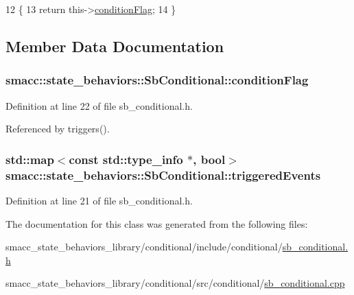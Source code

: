 \begin{DoxyCode}
12 \{
13     \textcolor{keywordflow}{return} this->\hyperlink{classsmacc_1_1state__behaviors_1_1SbConditional_aa998f63dc35b51916a896c62d9e03df1}{conditionFlag};
14 \}
\end{DoxyCode}


\subsection{Member Data Documentation}
\subsubsection[{\texorpdfstring{condition\+Flag}{conditionFlag}}]{ smacc\+::state\+\_\+behaviors\+::\+Sb\+Conditional\+::condition\+Flag\hspace{0.3cm}{\ttfamily [private]}}\hypertarget{classsmacc_1_1state__behaviors_1_1SbConditional_aa998f63dc35b51916a896c62d9e03df1}{}\label{classsmacc_1_1state__behaviors_1_1SbConditional_aa998f63dc35b51916a896c62d9e03df1}


Definition at line 22 of file sb\+\_\+conditional.\+h.



Referenced by triggers().

\subsubsection[{\texorpdfstring{triggered\+Events}{triggeredEvents}}]{\setlength{\rightskip}{0pt plus 5cm}std\+::map$<$const std\+::type\+\_\+info $\ast$, {\bf bool}$>$ smacc\+::state\+\_\+behaviors\+::\+Sb\+Conditional\+::triggered\+Events\hspace{0.3cm}{\ttfamily [private]}}\hypertarget{classsmacc_1_1state__behaviors_1_1SbConditional_ae05538e05b1308e90913fbc358b92e68}{}\label{classsmacc_1_1state__behaviors_1_1SbConditional_ae05538e05b1308e90913fbc358b92e68}


Definition at line 21 of file sb\+\_\+conditional.\+h.



The documentation for this class was generated from the following files\+:\begin{DoxyCompactItemize}
\item 
smacc\+\_\+state\+\_\+behaviors\+\_\+library/conditional/include/conditional/\hyperlink{sb__conditional_8h}{sb\+\_\+conditional.\+h}\item 
smacc\+\_\+state\+\_\+behaviors\+\_\+library/conditional/src/conditional/\hyperlink{sb__conditional_8cpp}{sb\+\_\+conditional.\+cpp}\end{DoxyCompactItemize}
